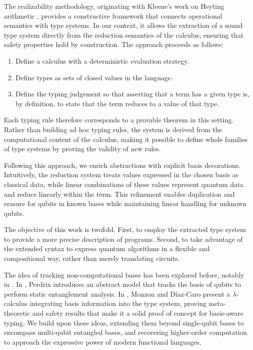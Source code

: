 \documentclass[runningheads,orivec,envcountsame,envcountsect]{llncs}
\begin{document}
The realizability methodology, originating with Kleene's work on Heyting
arithmetic \cite{KleeneJSL45}, provides a constructive framework that connects
operational semantics with type systems. In our context, it allows the
extraction of a sound type system directly from the reduction semantics of the
calculus, ensuring that safety properties hold by construction. The approach
proceeds as follows:
\begin{enumerate}
  \item Define a calculus with a deterministic evaluation strategy.
  \item Define types as sets of closed values in the language.
  \item Define the typing judgement so that asserting that a term has a given
  type is, by definition, to state that the term reduces to a value of that
  type.
\end{enumerate}
Each typing rule therefore corresponds to a provable theorem in this setting.
Rather than building ad hoc typing rules, the system is derived from the
computational content of the calculus, making it possible to define whole
families of type systems by proving the validity of new rules.

Following this approach, we enrich abstractions with explicit basis
decorations. Intuitively, the reduction system treats values expressed in the
chosen basis as classical data, while linear combinations of these values
represent quantum data and reduce linearly within the term. This refinement
enables duplication and erasure for qubits in known bases while maintaining
linear handling for unknown qubits.

The objective of this work is twofold. First, to employ the extracted type
system to provide a more precise description of programs. Second, to take
advantage of the extended syntax to express quantum algorithms in a flexible
and compositional way, rather than merely translating circuits.

The idea of tracking non-computational bases has been explored before, notably
in \cite{Perdrix2008,DiazcaroMonzonAPLAS25}. In \cite{Perdrix2008}, Perdrix
introduces an abstract model that tracks the basis of qubits to perform static
entanglement analysis. In \cite{DiazcaroMonzonAPLAS25}, Monzon and Díaz-Caro
present a $\lambda$-calculus integrating basis information into the type system,
proving meta-theoretic and safety results that make it a solid proof of concept
for basis-aware typing. We build upon these ideas, extending them beyond
single-qubit bases to encompass multi-qubit entangled bases, and recovering
higher-order computation to approach the expressive power of modern functional
languages.
\end{document}
